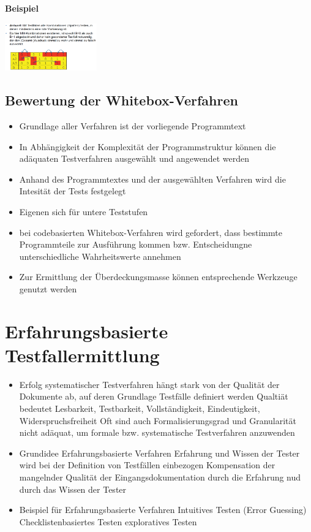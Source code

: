 \documentclass{report}
\newenvironment{Figure}
	{\par\medskip\noindent\minipage{\linewidth}}
	{\endminipage\par\medskip}
\theoremstyle{definition}
\theoremstyle{example}
\begin{document}
    \textbf{Beispiel}
    \begin{Figure}
       \centering
        \includegraphics[width=150px]{img/MMBeispielII.png}
            \label{fig:Beispiel MM Kombination Antwort}
        \end{Figure}

\subsection{Bewertung der Whitebox-Verfahren}
\begin{itemize}
   \item Grundlage aller Verfahren ist der vorliegende Programmtext
   \item In Abhängigkeit der Komplexität der Programmstruktur können die adäquaten Testverfahren ausgewählt und angewendet werden
   \item Anhand des Programmtextes und der ausgewählten Verfahren wird die Intesität der Tests festgelegt
   \item Eigenen sich für untere Teststufen
   \item bei codebasierten Whitebox-Verfahren wird gefordert, dass bestimmte Programmteile zur Ausführung kommen bzw. Entscheidungne unterschiedliche Wahrheitswerte annehmen
   \item Zur Ermittlung der Überdeckungsmasse können entsprechende Werkzeuge genutzt werden
\end{itemize}

\section{Erfahrungsbasierte Testfallermittlung}
\begin{itemize}
   \item Erfolg systematischer Testverfahren hängt stark von der Qualität der Dokumente ab, auf deren Grundlage Testfälle definiert werden
   \subitem Qualtiät bedeutet Lesbarkeit, Testbarkeit, Vollständigkeit, Eindeutigkeit, Widerspruchsfreiheit
   \subitem Oft sind auch Formalisierungsgrad und Granularität nicht adäquat, um formale bzw. systematische Testverfahren anzuwenden
   \item Grundidee Erfahrungsbasierte Verfahren
   \subitem Erfahrung und Wissen der Tester wird bei der Definition von Testfällen einbezogen
   \subitem Kompensation der mangelnder Qualität der Eingangsdokumentation durch die Erfahrung nud durch das Wissen der Tester
   \item Beispiel für Erfahrungsbasierte Verfahren
   \subitem Intuitives Testen (Error Guessing)
   \subitem Checklistenbasiertes Testen
   \subitem exploratives Testen 
\end{itemize}
\end{document}
